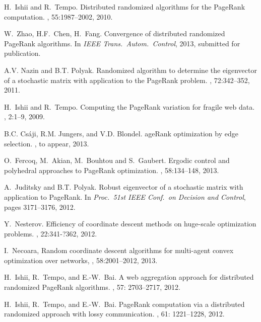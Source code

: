 \documentclass[11pt,draftcls,onecolumn]{IEEEtran}
\begin{document}
\begin{thebibliography}{1}
H.~Ishii and R.~Tempo.
\newblock Distributed randomized algorithms for the {P}age{R}ank computation.
, 55:1987--2002, 2010.

W.~Zhao, H.{\;}F.~Chen, H.~Fang.
\newblock Convergence of distributed randomized {P}age{R}ank algorithms.
\newblock In {\em IEEE Trans.\ Auto\-m.\ Control}, 2013, submitted for publication.

A.{\;}V. Nazin and B.{\;}T. Polyak.
\newblock Randomized algorithm to determine the eigenvector of a stochastic
  matrix with application to the {P}age{R}ank problem.
, 72:342--352, 2011.

H.~Ishii and R.~Tempo.
\newblock Computing the {P}age{R}ank variation for fragile web data.
, 2:1--9,
2009.

B.{\;}C. Cs\'{a}ji, R.{\;}M. Jungers, and V.{\;}D. Blondel.
age{R}ank optimization by edge selection.
, to appear, 2013.

O.~Fercoq, M.~Akian, M.~Bouhtou and S.~Gaubert.
\newblock Ergodic control and polyhedral approaches to PageRank optimization.
, 58:134--148, 2013.

A.~Juditsky and B.{\;}T. Polyak.
\newblock Robust eigenvector of a stochastic matrix with application to PageRank.
In {\em Proc.\ {\rm 51}st IEEE Conf.\ on Decision and Control}, 
pages 3171--3176,  2012.

Y.~Nesterov.
\newblock Efficiency of coordinate descent methods on huge-scale 
optimization problems.
, 22:341-?362, 2012.

I.~Necoara, 
\newblock Random coordinate descent algorithms for multi-agent convex 
optimization over networks,
, 58:2001--2012, 2013.



H.~Ishii, R.~Tempo, and E.-W.~Bai.
\newblock 
A web aggregation approach for distributed randomized PageRank algorithms.
, 57: 2703--2717, 2012.

H.~Ishii, R.~Tempo, and E.-W.~Bai.
\newblock 
PageRank computation via a distributed randomized approach with lossy communication.
, 61: 1221--1228, 2012. 


\end{thebibliography}
\end{document}

